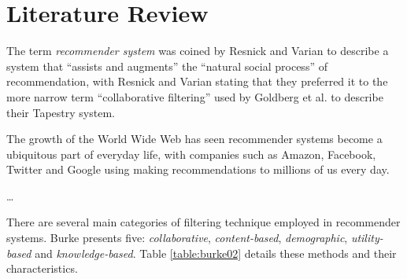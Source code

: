 \iffalse
Chapter 2: Literature Review and Context - the setting of the project in the context of other relevant work or theories or results. How this setting influenced the project.
\fi

\section{Literature Review}\label{literature review}

The term \textit{recommender system} was coined by Resnick and Varian \cite{Resnick97} to describe  a system that ``assists and augments'' the ``natural social process'' of recommendation, with Resnick and Varian stating that they preferred it to the more narrow term ``collaborative filtering'' used by Goldberg et al. \cite{Goldberg92}  to describe their Tapestry system.

The growth of the World Wide Web has seen recommender systems become a ubiquitous part of everyday life, with companies such as Amazon, Facebook, Twitter and Google using making recommendations to millions of us every day.

\ldots

There are several main categories of filtering technique employed in recommender systems. Burke \cite{Burke02} presents five: \textit{collaborative}, \textit{content-based}, \textit{demographic}, \textit{utility-based} and \textit{knowledge-based}. Table \ref{table:burke02} details these methods and their characteristics.

